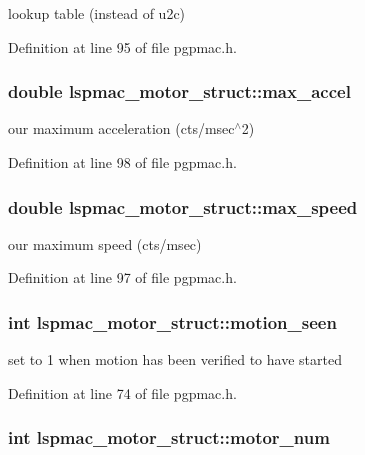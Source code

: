 lookup table (instead of u2c) 

Definition at line 95 of file pgpmac.h.\hypertarget{structlspmac__motor__struct_afec8dc1d4b97ba9c1d6e4f7a088342e4}{
\subsubsection[{max\_\-accel}]{\setlength{\rightskip}{0pt plus 5cm}double {\bf lspmac\_\-motor\_\-struct::max\_\-accel}}}
\label{structlspmac__motor__struct_afec8dc1d4b97ba9c1d6e4f7a088342e4}


our maximum acceleration (cts/msec$^\wedge$2) 

Definition at line 98 of file pgpmac.h.\hypertarget{structlspmac__motor__struct_af27159eeef80e4438446e01f24fae9d5}{
\subsubsection[{max\_\-speed}]{\setlength{\rightskip}{0pt plus 5cm}double {\bf lspmac\_\-motor\_\-struct::max\_\-speed}}}
\label{structlspmac__motor__struct_af27159eeef80e4438446e01f24fae9d5}


our maximum speed (cts/msec) 

Definition at line 97 of file pgpmac.h.\hypertarget{structlspmac__motor__struct_a68c471836f52707fa8582f7860cf500f}{
\subsubsection[{motion\_\-seen}]{\setlength{\rightskip}{0pt plus 5cm}int {\bf lspmac\_\-motor\_\-struct::motion\_\-seen}}}
\label{structlspmac__motor__struct_a68c471836f52707fa8582f7860cf500f}


set to 1 when motion has been verified to have started 

Definition at line 74 of file pgpmac.h.\hypertarget{structlspmac__motor__struct_a45fae17618f0c0827e97060dc04f79cb}{
\subsubsection[{motor\_\-num}]{\setlength{\rightskip}{0pt plus 5cm}int {\bf lspmac\_\-motor\_\-struct::motor\_\-num}}}
\label{structlspmac__motor__struct_a45fae17618f0c0827e97060dc04f79cb}


